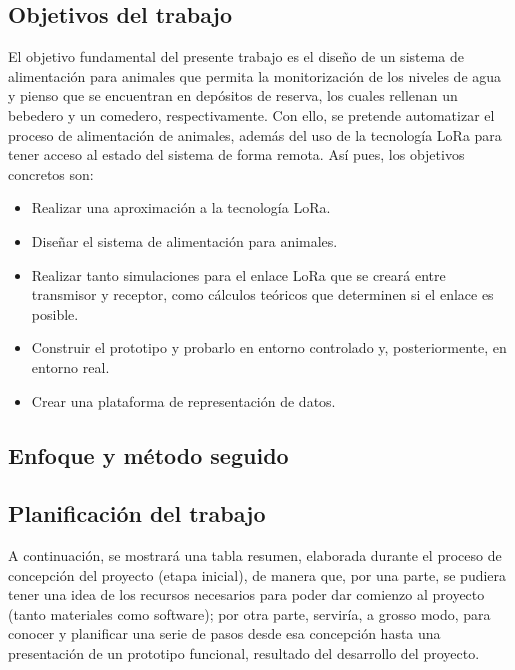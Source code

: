 \documentclass[12pt]{article}
\begin{document}
	\subsection[Objetivos del trabajo]{Objetivos del trabajo}
	\label{subsection: objetivos del trabajo}
	El objetivo fundamental del presente trabajo es el diseño de un sistema de alimentación para animales que permita la monitorización de los niveles de agua y pienso que se encuentran en depósitos de reserva, los cuales rellenan un bebedero y un comedero, respectivamente.  Con ello, se pretende automatizar el proceso de alimentación de animales, además del uso de la tecnología LoRa para tener acceso al estado del sistema de forma remota. Así pues, los objetivos concretos son:
	
	\begin{itemize}
		\item Realizar una aproximación a la tecnología LoRa.
		\item Diseñar el sistema de alimentación para animales.
		\item Realizar tanto simulaciones para el enlace LoRa que se creará entre transmisor y receptor, como cálculos teóricos que determinen si el enlace es posible.
		\item Construir el prototipo y probarlo en entorno controlado y, posteriormente, en entorno real.
		\item Crear una plataforma de representación de datos.
	\end{itemize}
	
	\subsection[Enfoque y método seguido]{Enfoque y método seguido}
	\subsection[Planificación del trabajo]{Planificación del trabajo}
	
	\noindent A continuación, se mostrará una tabla resumen, elaborada durante el proceso de concepción del proyecto (etapa inicial), de manera que, por una parte, se pudiera tener una idea de los recursos necesarios para poder dar comienzo al proyecto (tanto materiales como software); por otra parte, serviría, a grosso modo, para conocer y planificar una serie de pasos desde esa concepción hasta una presentación de un prototipo funcional, resultado del desarrollo del proyecto. \\
	
\end{document}
